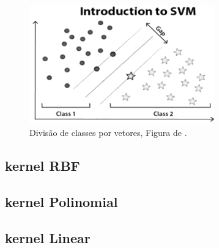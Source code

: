 \begin{figure}[h]
    \centering
    \includegraphics[width=8cm]{figuras/SVM/SVM_1.png}
    \caption{Divisão de classes por vetores, Figura de \cite{BattaMahesh2018}.}
    \label{fig:SVM_1}
\end{figure}

\subsection{kernel RBF}



\subsection{kernel Polinomial}

\subsection{kernel Linear}
